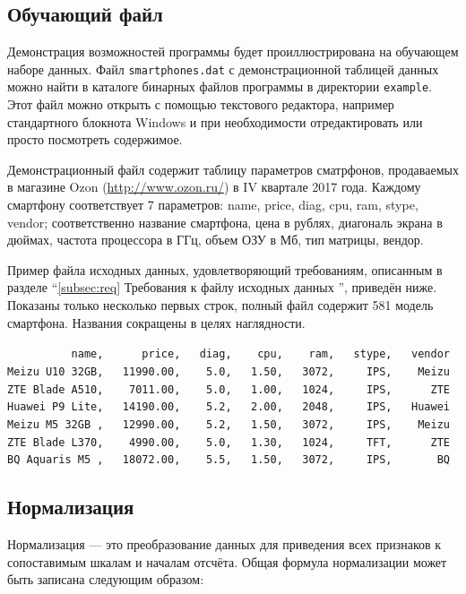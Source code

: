 \documentclass[12pt,twoside,a4paper,tikz,border=5]{refart}
\begin{document}
\subsection{Обучающий файл}
\label{subsec:trainfile}

Демонстрация возможностей программы будет проиллюстрирована на обучающем наборе данных. Файл \texttt{smartphones.dat} с демонстрационной таблицей данных можно найти в каталоге бинарных файлов программы в директории \texttt{example}. Этот файл можно открыть с помощью текстового редактора, например стандартного блокнота Windows и при необходимости отредактировать или просто посмотреть содержимое. 

Демонстрационный файл содержит таблицу параметров сматрфонов, продаваемых в магазине Ozon (\url{http://www.ozon.ru/}) в IV квартале 2017 года. Каждому смартфону соответствует 7 параметров: name, price, diag, cpu, ram, stype, vendor; соответственно название смартфона, цена в рублях, диагональ экрана в дюймах, частота процессора в ГГц, объем ОЗУ в Мб, тип матрицы, вендор.

Пример файла исходных данных, удовлетворяющий требованиям, описанным в разделе ``\ref{subsec:req} Требования к файлу исходных данных '', приведён ниже. Показаны только несколько первых строк, полный файл содержит 581 модель смартфона. Названия сокращены в целях наглядности.

\begin{tcolorbox}[colframe=black!50!black,coltext=black!25!black,colback=white,title=\textbf{Пример файла входных данных \texttt{data.csv}}]
	\verb|          name,      price,   diag,    cpu,    ram,   stype,   vendor |\\
	\verb|Meizu U10 32GB,   11990.00,    5.0,   1.50,   3072,     IPS,    Meizu |\\
	\verb|ZTE Blade A510,    7011.00,    5.0,   1.00,   1024,     IPS,      ZTE |\\
	\verb|Huawei P9 Lite,   14190.00,    5.2,   2.00,   2048,     IPS,   Huawei |\\
	\verb|Meizu M5 32GB ,   12990.00,    5.2,   1.50,   3072,     IPS,    Meizu |\\
	\verb|ZTE Blade L370,    4990.00,    5.0,   1.30,   1024,     TFT,      ZTE |\\
	\verb|BQ Aquaris M5 ,   18072.00,    5.5,   1.50,   3072,     IPS,       BQ |\\	
\end{tcolorbox}

\subsection{Нормализация}
\label{subsec:norm}
Нормализация --- это преобразование данных для приведения всех признаков к сопоставимым шкалам и началам отсчёта. Общая формула нормализации может быть записана следующим образом:
\end{document}
